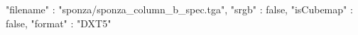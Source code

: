 { 
	"filename" : "sponza/sponza_column_b_spec.tga", 
	"srgb" : false,
	"isCubemap" : false,
	"format" : "DXT5"
}